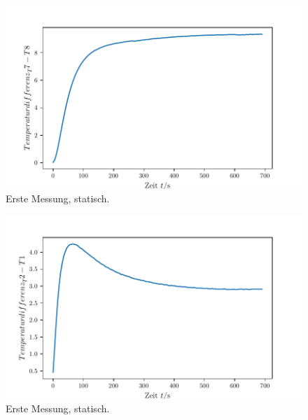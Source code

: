 \begin{figure}
    \centering
    \includegraphics[max width=\linewidth]{build/plot_tempDiff_t7t8.pdf}
    \caption{Erste Messung, statisch.}
    \label{fig:plot_tempDiff_t7t8}
\end{figure}

\begin{figure}
    \centering
    \includegraphics[max width=\linewidth]{build/plot_tempDiff_t2t1.pdf}
    \caption{Erste Messung, statisch.}
    \label{fig:plot_tempDiff_t2t1}
\end{figure}


